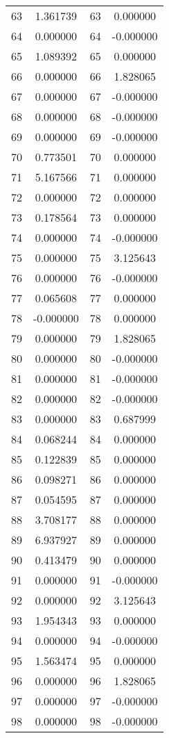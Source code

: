 \documentclass[12pt]{article}
\begin{document}
\begin{longtable}{@{}cccc@{}}
63 & 1.361739 & 63 & 0.000000 \\
64 & 0.000000 & 64 & -0.000000 \\
65 & 1.089392 & 65 & 0.000000 \\
66 & 0.000000 & 66 & 1.828065 \\
67 & 0.000000 & 67 & -0.000000 \\
68 & 0.000000 & 68 & -0.000000 \\
69 & 0.000000 & 69 & -0.000000 \\
70 & 0.773501 & 70 & 0.000000 \\
71 & 5.167566 & 71 & 0.000000 \\
72 & 0.000000 & 72 & 0.000000 \\
73 & 0.178564 & 73 & 0.000000 \\
74 & 0.000000 & 74 & -0.000000 \\
75 & 0.000000 & 75 & 3.125643 \\
76 & 0.000000 & 76 & -0.000000 \\
77 & 0.065608 & 77 & 0.000000 \\
78 & -0.000000 & 78 & 0.000000 \\
79 & 0.000000 & 79 & 1.828065 \\
80 & 0.000000 & 80 & -0.000000 \\
81 & 0.000000 & 81 & -0.000000 \\
82 & 0.000000 & 82 & -0.000000 \\
83 & 0.000000 & 83 & 0.687999 \\
84 & 0.068244 & 84 & 0.000000 \\
85 & 0.122839 & 85 & 0.000000 \\
86 & 0.098271 & 86 & 0.000000 \\
87 & 0.054595 & 87 & 0.000000 \\
88 & 3.708177 & 88 & 0.000000 \\
89 & 6.937927 & 89 & 0.000000 \\
90 & 0.413479 & 90 & 0.000000 \\
91 & 0.000000 & 91 & -0.000000 \\
92 & 0.000000 & 92 & 3.125643 \\
93 & 1.954343 & 93 & 0.000000 \\
94 & 0.000000 & 94 & -0.000000 \\
95 & 1.563474 & 95 & 0.000000 \\
96 & 0.000000 & 96 & 1.828065 \\
97 & 0.000000 & 97 & -0.000000 \\
98 & 0.000000 & 98 & -0.000000 \\

\end{longtable}
\end{document}
